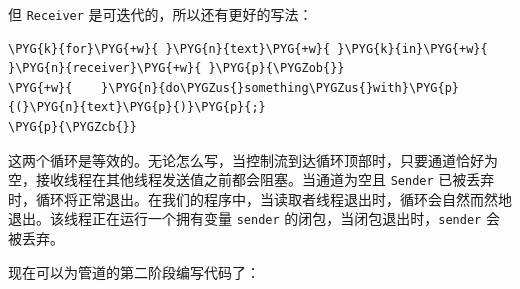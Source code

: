 但 \texttt{Receiver} 是可迭代的，所以还有更好的写法：

\begin{Verbatim}[commandchars=\\\{\},breaklines=true,breakanywhere=true,fontsize=\codefont,xleftmargin=17bp]
\PYG{k}{for}\PYG{+w}{ }\PYG{n}{text}\PYG{+w}{ }\PYG{k}{in}\PYG{+w}{ }\PYG{n}{receiver}\PYG{+w}{ }\PYG{p}{\PYGZob{}}
\PYG{+w}{    }\PYG{n}{do\PYGZus{}something\PYGZus{}with}\PYG{p}{(}\PYG{n}{text}\PYG{p}{)}\PYG{p}{;}
\PYG{p}{\PYGZcb{}}
\end{Verbatim}

这两个循环是等效的。无论怎么写，当控制流到达循环顶部时，只要通道恰好为空，接收线程在其他线程发送值之前都会阻塞。当通道为空且 \texttt{Sender} 已被丢弃时，循环将正常退出。在我们的程序中，当读取者线程退出时，循环会自然而然地退出。该线程正在运行一个拥有变量 \texttt{sender} 的闭包，当闭包退出时，\texttt{sender} 会被丢弃。

现在可以为管道的第二阶段编写代码了：

